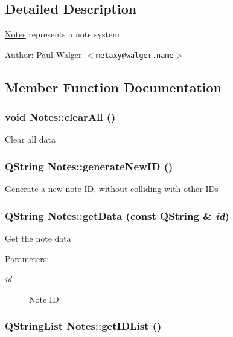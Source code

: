 \subsection{Detailed Description}
\hyperlink{classNotes}{Notes} represents a note system

\begin{Desc}
\item[Author:]Paul Walger $<$\href{mailto:metaxy@walger.name}{\tt metaxy@walger.name}$>$ \end{Desc}


\subsection{Member Function Documentation}
\hypertarget{classNotes_9abdabc242dc6340e4b5157fb3620ee0}{
\subsubsection[{clearAll}]{\setlength{\rightskip}{0pt plus 5cm}void Notes::clearAll ()}}
\label{classNotes_9abdabc242dc6340e4b5157fb3620ee0}


Clear all data \hypertarget{classNotes_b554798a22ce20a2f7cb195c3b1904bd}{
\subsubsection[{generateNewID}]{\setlength{\rightskip}{0pt plus 5cm}QString Notes::generateNewID ()}}
\label{classNotes_b554798a22ce20a2f7cb195c3b1904bd}


Generate a new note ID, without colliding with other IDs \hypertarget{classNotes_3a60de9ba1c1fc3e1cd118ca50443f02}{
\subsubsection[{getData}]{\setlength{\rightskip}{0pt plus 5cm}QString Notes::getData (const QString \& {\em id})}}
\label{classNotes_3a60de9ba1c1fc3e1cd118ca50443f02}


Get the note data \begin{Desc}
\item[Parameters:]
\begin{description}
\item[{\em id}]Note ID \end{description}
\end{Desc}
\hypertarget{classNotes_ee2eb5a4a6cf347e38351585de15c013}{
\subsubsection[{getIDList}]{\setlength{\rightskip}{0pt plus 5cm}QStringList Notes::getIDList ()}}
\label{classNotes_ee2eb5a4a6cf347e38351585de15c013}


